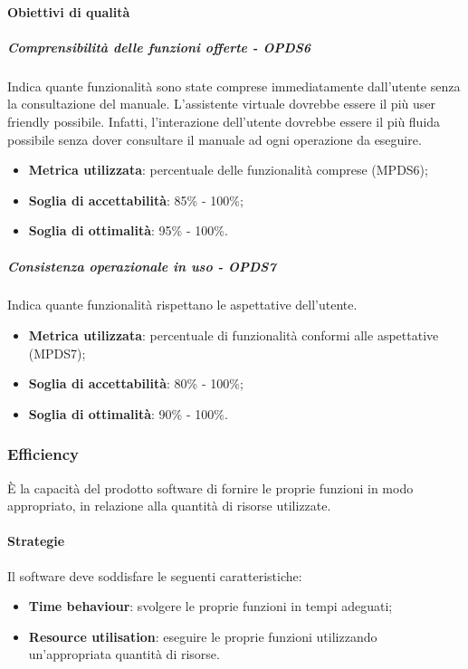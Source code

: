 \documentclass[PdQ.tex]{subfiles}
\begin{document}
			\paragraph{Obiettivi di qualità}
			
				\subparagraph{Comprensibilità delle funzioni offerte - OPDS6}
				Indica quante funzionalità sono state comprese immediatamente dall'utente senza la consultazione del manuale. L'assistente virtuale dovrebbe essere
				il più user friendly possibile. Infatti, l'interazione dell'utente dovrebbe essere il più fluida possibile senza dover consultare il manuale
				ad ogni operazione da eseguire.
				\begin{itemize}
					\item \textbf{Metrica utilizzata}: percentuale delle funzionalità comprese (MPDS6);
					\item \textbf{Soglia di accettabilità}: 85\% - 100\%;
					\item \textbf{Soglia di ottimalità}: 95\% - 100\%.
				\end{itemize}
			
				\subparagraph{Consistenza operazionale in uso - OPDS7}
				Indica quante funzionalità rispettano le aspettative dell'utente.
				\begin{itemize}
					\item \textbf{Metrica utilizzata}: percentuale di funzionalità conformi alle aspettative (MPDS7);
					\item \textbf{Soglia di accettabilità}: 80\% - 100\%;
					\item \textbf{Soglia di ottimalità}: 90\% - 100\%.
				\end{itemize}
		
		\subsubsection{Efficiency}
		È la capacità del prodotto software di fornire le proprie funzioni in modo appropriato, in relazione alla quantità di risorse utilizzate.
		
			\paragraph{Strategie}
			Il software deve soddisfare le seguenti caratteristiche:
			\begin{itemize}
				\item \textbf{Time behaviour}: svolgere le proprie funzioni in tempi adeguati;
				\item \textbf{Resource utilisation}: eseguire le proprie funzioni utilizzando un'appropriata quantità di risorse.			
			\end{itemize}
			
\end{document}
